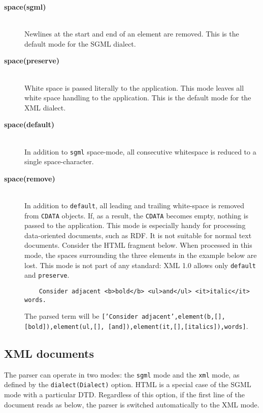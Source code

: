 \begin{description}
\item[{\bf space}{\bf (sgml)}]\mbox{}\\
  Newlines at the start and end of an element are removed.
    This is the default mode for the SGML dialect. 

\item[{\bf space}{\bf (preserve)}]\mbox{}\\
  White space is passed literally to the application. This mode leaves all
  white space handling to the application. This is the default mode for
  the XML dialect. 

\item[{\bf space}{\bf (default)}]\mbox{}\\
  In addition to {\tt sgml} space-mode, all consecutive whitespace is 
  reduced to a single space-character.

\item[{\bf space}{\bf (remove)}]\mbox{}\\
  In addition to {\tt default}, all leading and trailing white-space is 
  removed from {\tt CDATA} objects. If, as a result, the {\tt CDATA} 
  becomes empty, nothing is passed to the application. This mode is 
  especially handy for processing data-oriented documents, such as RDF. 
  It is not suitable for normal text documents. Consider the HTML 
  fragment below. When processed in this mode, the spaces surrounding the 
  three elements in the example below are lost.  This mode is not part of
  any standard: XML 1.0 allows only {\tt default} and {\tt preserve}.
\begin{verbatim}
    Consider adjacent <b>bold</b> <ul>and</ul> <it>italic</it> words.
\end{verbatim}
  The parsed term will be
  {\tt ['Consider adjacent',element(b,[],[bold]),element(ul,[], [and]),element(it,[],[italics]),words]}.


\end{description}

\subsection{XML documents}\label{sec:xml}

The parser can operate in two modes:
the {\tt sgml} mode and
the {\tt xml} mode, as 
defined by the {\tt dialect(Dialect)} option. HTML is a special case of
the SGML mode with a particular DTD. Regardless of this 
option, if the first line of the document reads as below, the parser is 
switched automatically to the XML mode.


